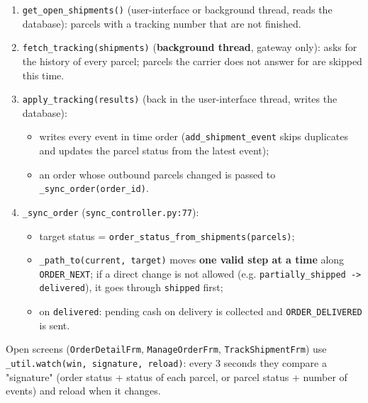 \begin{enumerate}
\def\labelenumi{\arabic{enumi}.}
\tightlist
\item
  \texttt{get\_\allowbreak{}open\_\allowbreak{}shipments(\allowbreak{})} (user-interface or background thread,
  reads the database): parcels with a tracking number that are not
  finished.
\item
  \texttt{fetch\_\allowbreak{}tracking(\allowbreak{}shipments)} (\textbf{background thread},
  gateway only): asks for the history of every parcel; parcels the
  carrier does not answer for are skipped this time.
\item
  \texttt{apply\_\allowbreak{}tracking(\allowbreak{}results)} (back in the user-interface thread,
  writes the database):

  \begin{itemize}
  \tightlist
  \item
    writes every event in time order (\texttt{add\_\allowbreak{}shipment\_\allowbreak{}event}
    skips duplicates and updates the parcel status from the latest
    event);
  \item
    an order whose outbound parcels changed is passed to
    \texttt{\_\allowbreak{}sync\_\allowbreak{}order(\allowbreak{}order\_\allowbreak{}id)}.
  \end{itemize}
\item
  \texttt{\_\allowbreak{}sync\_\allowbreak{}order} (\texttt{sync\_\allowbreak{}controller.\allowbreak{}py:77}):

  \begin{itemize}
  \tightlist
  \item
    target status = \texttt{order\_\allowbreak{}status\_\allowbreak{}from\_\allowbreak{}shipments(\allowbreak{}parcels)};
  \item
    \texttt{\_\allowbreak{}path\_\allowbreak{}to(\allowbreak{}current,\allowbreak{} target)} moves \textbf{one valid step
    at a time} along \texttt{ORDER\_\allowbreak{}NEXT}; if a direct change is not
    allowed (e.g.
    \texttt{partially\_\allowbreak{}shipped -\textgreater{}\allowbreak{} delivered}), it goes
    through \texttt{shipped} first;
  \item
    on \texttt{delivered}: pending cash on delivery is collected and
    \texttt{ORDER\_\allowbreak{}DELIVERED} is sent.
  \end{itemize}
\end{enumerate}

Open screens (\texttt{OrderDetailFrm}, \texttt{ManageOrderFrm},
\texttt{TrackShipmentFrm}) use
\texttt{\_\allowbreak{}util.\allowbreak{}watch(\allowbreak{}win,\allowbreak{} signature,\allowbreak{} reload)}: every 3 seconds they
compare a "signature" (order status + status of each parcel, or parcel
status + number of events) and reload when it changes.

